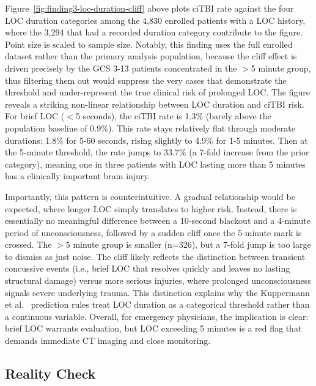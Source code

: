 \documentclass[11pt,letterpaper]{article}
\begin{document}
Figure~\ref{fig:finding3-loc-duration-cliff} above plots ciTBI rate against the four LOC duration categories among the 4,830 enrolled patients with a LOC history, where the 3,294 that had a recorded duration category contribute to the figure. Point size is scaled to sample size. Notably, this finding uses the full enrolled dataset rather than the primary analysis population, because the cliff effect is driven precisely by the GCS 3-13 patients concentrated in the $>$5 minute group, thus filtering them out would suppress the very cases that demonstrate the threshold and under-represent the true clinical risk of prolonged LOC. The figure reveals a striking non-linear relationship between LOC duration and ciTBI risk. For brief LOC ($<$5 seconds), the ciTBI rate is 1.3\% (barely above the population baseline of 0.9\%). This rate stays relatively flat through moderate durations: 1.8\% for 5-60 seconds, rising slightly to 4.9\% for 1-5 minutes. Then at the 5-minute threshold, the rate jumps to 33.7\% (a 7-fold increase from the prior category), meaning one in three patients with LOC lasting more than 5 minutes has a clinically important brain injury.

Importantly, this pattern is counterintuitive. A gradual relationship would be expected, where longer LOC simply translates to higher risk. Instead, there is essentially no meaningful difference between a 10-second blackout and a 4-minute period of unconsciousness, followed by a sudden cliff once the 5-minute mark is crossed. The $>$5 minute group is smaller (n=326), but a 7-fold jump is too large to dismiss as just noise. The cliff likely reflects the distinction between transient concussive events (i.e., brief LOC that resolves quickly and leaves no lasting structural damage) versus more serious injuries, where prolonged unconsciousness signals severe underlying trauma. This distinction explains why the Kuppermann et al.~\cite{kuppermann2009} prediction rules treat LOC duration as a categorical threshold rather than a continuous variable. Overall, for emergency physicians, the implication is clear: brief LOC warrants evaluation, but LOC exceeding 5 minutes is a red flag that demands immediate CT imaging and close monitoring.

\subsection{Reality Check}\label{reality-check}
\end{document}
